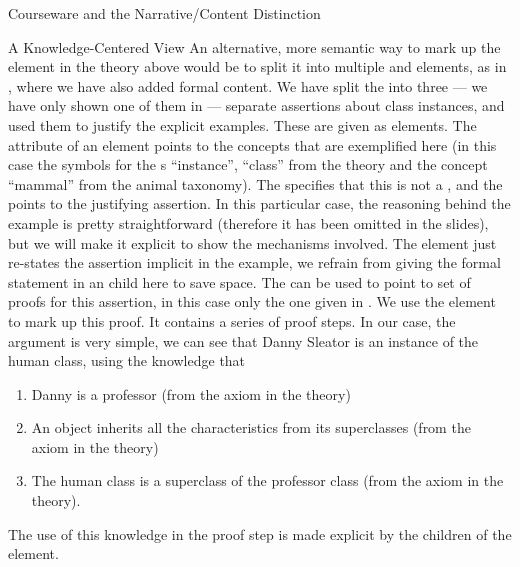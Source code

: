 \begin{tchapter}[id=courseware]{Courseware and the Narrative/Content Distinction}
\begin{tsection}[id=knowledge-centered]{A Knowledge-Centered View}
An alternative, more semantic way to mark up the {} element in the
theory above would be to split it into multiple {} and
{} elements, as in {}, where we have also added
formal content. We have split the {} {} into
three --- we have only shown one of them in {} --- separate
assertions about class instances, and used them to justify the explicit examples. These
are given as {\omdoc} {} elements. The {}
attribute of an {} element points to the concepts that are exemplified
here (in this case the symbols for the {s} ``instance'', ``class'' from
the theory {} and the concept ``mammal'' from the animal taxonomy). The
{} specifies that this is not a {}, and
the {} points to the justifying assertion. In this
particular case, the reasoning behind the example is pretty straightforward (therefore it
has been omitted in the slides), but we will make it explicit to show the mechanisms
involved. The {} element just re-states the assertion implicit in the
example, we refrain from giving the formal statement in an {} child here to
save space. The {}
can be used to point to set of proofs for this assertion, in this case only the one given
in {}. We use the {\omdoc} {} element to mark up this
proof.  It contains a series of {} proof steps. In our case, the argument
is very simple, we can see that Danny Sleator is an instance of the human class, using the
knowledge that
\begin{enumerate}
\item Danny is a professor (from the axiom in the {} theory)
\item An object inherits all the characteristics from its superclasses (from the
  axiom {} in the {} theory)
\item The human class is a superclass of the professor class (from the axiom
  {} in the {} theory).
\end{enumerate}
The use of this knowledge in the proof step is made explicit by the
{} children of the {} element.


\end{tsection}
\end{tchapter}
